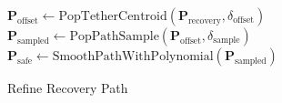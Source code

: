 \begin{algorithm}[H]
\LinesNotNumbered  %

\LinesNotNumbered  %





\BlankLine
$\mathbf{P}_{\text{offset}} \gets \text{PopTetherCentroid}(\mathbf{P}_{\text{recovery}}, \delta_{\text{offset}})$\;
$\mathbf{P}_{\text{sampled}} \gets \text{PopPathSample}(\mathbf{P}_{\text{offset}}, \delta_{\text{sample}})$\;
$\mathbf{P}_{\text{safe}} \gets \text{SmoothPathWithPolynomial}(\mathbf{P}_{\text{sampled}})$\;
\;
\caption{Refine Recovery Path}
\label{alg:refine_path}
\end{algorithm}